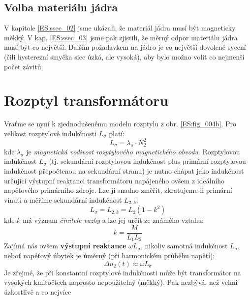 {    \subsection{Volba materiálu jádra}\label{ES:ssec_04}
      V kapitole \ref{ES:ssec_02} jsme ukázali, že materiál jádra musí být magneticky měkký. V kap. 
      \ref{ES:ssec_03} jsme pak zjistili, že měrný odpor materiálu jádra musí být co největší.
      Dalším požadavkem na jádro je co největší dovolené sycení (čili hysterezní smyčka sice úzká, 
      ale vysoká), aby bylo možno volit co nejmenší počet závitů.
    
  \section{Rozptyl transformátoru}
    Vraťme se nyní k zjednodušenému modelu rozptylu z obr. \ref{ES:fig_004b}. Pro velikost
    roz\-ptyl\-ové indukčnosti $L_\sigma$ platí:
    \begin{equation}\label{es:eq_Lsigma}
      L_\sigma=\lambda_\sigma\cdot N_2^2
    \end{equation}
    kde $\lambda_\sigma$ je \emph{magnetická vodivost rozptylového magnetického obvodu}. 
    Rozptylovou indukčnost $L_\sigma$ (tj. sekundární rozptylovou indukčnost plus primární 
    rozptylovou indukčnost přepočtenou na sekundární stranu) je nutno chápat jako indukčnost 
    určující výstupní reaktanci transformátoru napájeného ovšem z ideálního napěťového primárního 
    zdroje. Lze ji snadno změřit, zkratujeme-li primární vinutí a měříme sekundární indukčnost
    $L_{2,k}$:
    \begin{equation}\label{es:eq_L2k}
      L_\sigma=L_{2,k}= L_2(1-k^2)
    \end{equation}
    kde $k$ má význam \emph{činitele vazby} a lze jej určit ze známého vztahu:
    \begin{equation}\label{es:eq_cinitel_vazby}
      k=\frac{M}{L_1L_2}
    \end{equation}
    Zajímá nás ovšem \textbf{výstupní reaktance} $\omega L_\sigma$, nikoliv samotná indukčnost 
    $L_\sigma$, neboť napěťový úbytek je úměrný (při harmonickém průběhu napětí):
    \begin{equation}\label{es:eq_nap_ubytek}
      \Delta u_2(t)\approx \omega L_\sigma
    \end{equation}
    Je zřejmé, že při konstantní rozptylové indukčnosti může být transformátor na vysokých 
    kmitočtech naprosto nepoužitelný (měkký). Pak nezbývá, než velmi ú\-zkost\-li\-vě a co nejvíce 
}
